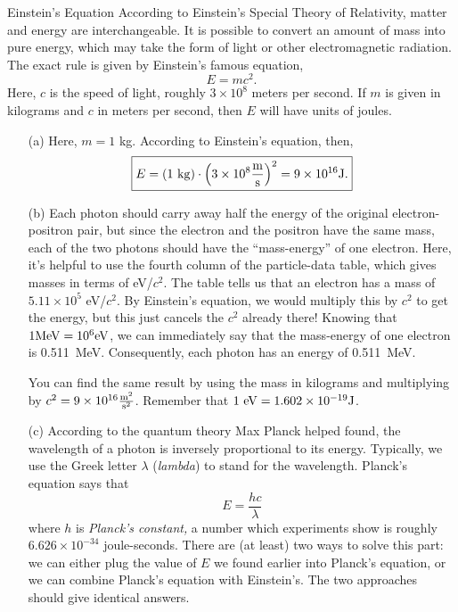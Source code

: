 \documentclass[12pt]{article}
\begin{document}
\begin{probdesc}{7}{Einstein's Equation}
According to Einstein's Special Theory of Relativity, matter and
energy are interchangeable.  It is possible to convert an amount of
mass into pure energy, which may take the form of light or other
electromagnetic radiation.  The exact rule is given by Einstein's
famous equation,
\begin{equation}
E = mc^2.
\end{equation}
Here, $c$ is the speed of light, roughly $3\times10^8$ meters per
second.  If $m$ is given in kilograms and $c$ in meters per second,
then $E$ will have units of joules.
\begin{enumerate}
\item[(a)] Here, $m = 1$ kg.  According to Einstein's equation, then,
\begin{equation}
\boxed{E = (1 {\rm\ kg}) \cdot \left(3\times10^8 \frac{\rm m}{\rm
    s}\right)^2 = 9\times10^{16} \rm J.}
\end{equation}


\item[(b)] Each photon should carry away half the energy of the
  original electron-positron pair, but since the electron and the
  positron have the same mass, each of the two photons should have the
  ``mass-energy'' of one electron.  Here, it's helpful to use the
  fourth column of the particle-data table, which gives masses in
  terms of eV/$c^2$.  The table tells us that an electron has a mass
  of $5.11\times10^5$ eV/$c^2$.  By Einstein's equation, we would
  multiply this by $c^2$ to get the energy, but this just cancels the
  $c^2$ already there!  Knowing that $1 {\rm MeV} = 10^6 {\rm
  eV}$, we can immediately say that the mass-energy of one electron is
  0.511~MeV.  Consequently, each photon has an energy of 0.511~MeV.

  You can find the same result by using the mass in kilograms and
  multiplying by $c^2 = 9\times10^{16} \frac{{\rm m}^2}{{\rm s}^2}$.
  Remember that $1 {\rm\ eV} = 1.602\times10^{-19} {\rm J}$.

\item[(c)] According to the quantum theory Max Planck helped found,
  the wavelength of a photon is inversely proportional to its energy.
  Typically, we use the Greek letter $\lambda$ ({\em lambda}) to stand
  for the wavelength.  Planck's equation says that
  \begin{equation}
    E = \frac{hc}{\lambda}
  \end{equation}
  where $h$ is {\em Planck's constant,} a number which experiments
  show is roughly $6.626\times10^{-34}$ joule-seconds.  There are (at
  least) two ways to solve this part: we can either plug the value of
  $E$ we found earlier into Planck's equation, or we can combine
  Planck's equation with Einstein's.  The two approaches should give
  identical answers.


\end{enumerate}
\end{probdesc}
\end{document}
